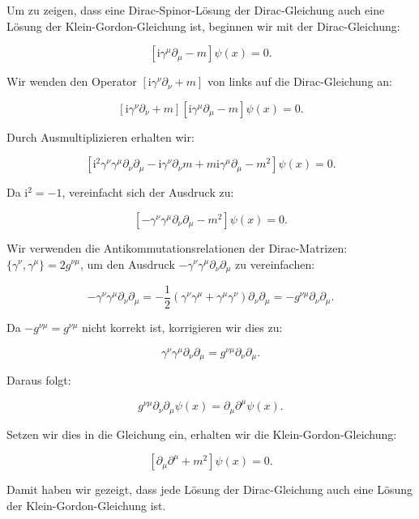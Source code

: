 Um zu zeigen, dass eine Dirac-Spinor-Lösung der Dirac-Gleichung auch eine Lösung der Klein-Gordon-Gleichung ist, beginnen wir mit der Dirac-Gleichung:

\[
\left[\mathrm{i} \gamma^\mu \partial_\mu - m\right] \psi(x) = 0.
\]

Wir wenden den Operator \(\left[\mathrm{i} \gamma^\nu \partial_\nu + m\right]\) von links auf die Dirac-Gleichung an:

\[
\left[\mathrm{i} \gamma^\nu \partial_\nu + m\right] \left[\mathrm{i} \gamma^\mu \partial_\mu - m\right] \psi(x) = 0.
\]

Durch Ausmultiplizieren erhalten wir:

\[
\left[\mathrm{i}^2 \gamma^\nu \gamma^\mu \partial_\nu \partial_\mu - \mathrm{i} \gamma^\nu \partial_\nu m + m \mathrm{i} \gamma^\mu \partial_\mu - m^2\right] \psi(x) = 0.
\]

Da \(\mathrm{i}^2 = -1\), vereinfacht sich der Ausdruck zu:

\[
\left[-\gamma^\nu \gamma^\mu \partial_\nu \partial_\mu - m^2\right] \psi(x) = 0.
\]

Wir verwenden die Antikommutationsrelationen der Dirac-Matrizen: \(\{\gamma^\nu, \gamma^\mu\} = 2g^{\nu\mu}\), um den Ausdruck \(-\gamma^\nu \gamma^\mu \partial_\nu \partial_\mu\) zu vereinfachen:

\[
-\gamma^\nu \gamma^\mu \partial_\nu \partial_\mu = -\frac{1}{2} \left(\gamma^\nu \gamma^\mu + \gamma^\mu \gamma^\nu\right) \partial_\nu \partial_\mu = -g^{\nu\mu} \partial_\nu \partial_\mu.
\]

Da \(-g^{\nu\mu} = g^{\nu\mu}\) nicht korrekt ist, korrigieren wir dies zu:

\[
\gamma^\nu \gamma^\mu \partial_\nu \partial_\mu = g^{\nu\mu} \partial_\nu \partial_\mu.
\]

Daraus folgt:

\[
g^{\nu\mu} \partial_\nu \partial_\mu \psi(x) = \partial_\mu \partial^\mu \psi(x).
\]

Setzen wir dies in die Gleichung ein, erhalten wir die Klein-Gordon-Gleichung:

\[
\left[\partial_\mu \partial^\mu + m^2\right] \psi(x) = 0.
\]

Damit haben wir gezeigt, dass jede Lösung der Dirac-Gleichung auch eine Lösung der Klein-Gordon-Gleichung ist.

